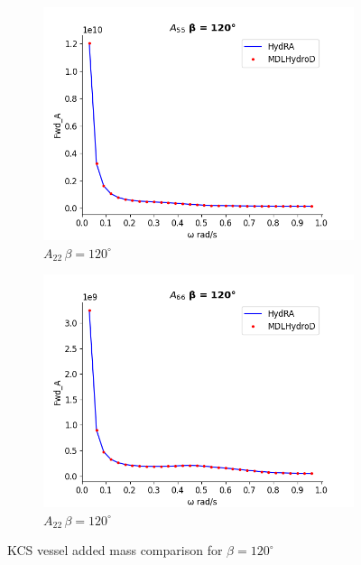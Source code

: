 \begin{figure}[H]
\begin{subfigure}[b]{0.49\textwidth}
        \includegraphics[width=\textwidth]{plots/kcs/added_mass/a55.png}
        \caption{$A_{22} \, \beta = 120^{\circ}$}
    \end{subfigure}
    \begin{subfigure}[b]{0.49\textwidth}
        \includegraphics[width=\textwidth]{plots/kcs/added_mass/a66.png}
        \caption{$A_{22} \, \beta = 120^{\circ}$}
    \end{subfigure}
    \caption{KCS vessel added mass comparison for $\beta=120^{\circ}$}
    \label{fig:kcs_addedmass_1}
\end{figure}

